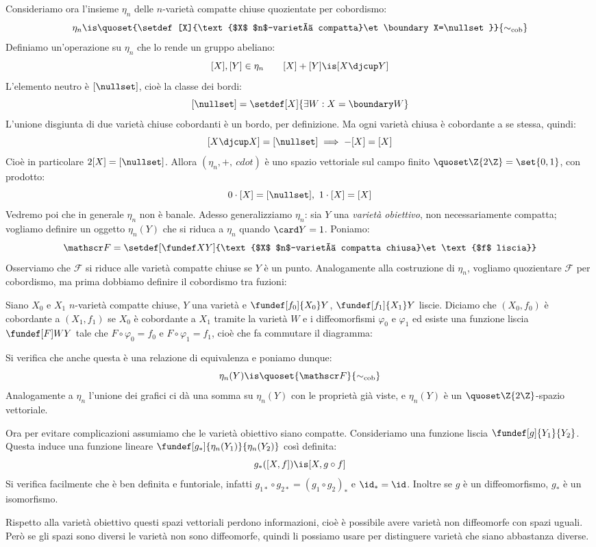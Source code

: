 Consideriamo ora l'insieme $\eta_n$ delle $n$-varietà compatte chiuse quozientate per cobordismo:
\[\eta_n\is\quoset{\setdef[X]{\text{$X$ $n$-varietà compatta}\et\boundary X=\nullset}}{\sim_\text{cob}}\]
Definiamo un'operazione su $\eta_n$ che lo rende un gruppo abeliano:
\[[X],[Y]\in\eta_n\qquad[X]+[Y]\is[X\djcup Y]\]
L'elemento neutro è $[\nullset]$, cioè la classe dei bordi:
\[[\nullset]=\setdef[X]{\exists W:X=\boundary W}\]
L'unione disgiunta di due varietà chiuse cobordanti è un bordo, per definizione. Ma ogni varietà chiusa è cobordante a se stessa, quindi:
\[[X\djcup X]=[\nullset]\implies-[X]=[X]\]
Cioè in particolare $2[X]=[\nullset]$. Allora $(\eta_n,+,\	cdot)$ è uno spazio vettoriale sul campo finito $\quoset\Z{2\Z}=\set{0,1}$, con prodotto:
\[0\cdot[X]=[\nullset],\ 1\cdot[X]=[X]\]
Vedremo poi che in generale $\eta_n$ non è banale. Adesso generalizziamo $\eta_n$: sia $Y$ una \emph{varietà obiettivo}, non necessariamente compatta; vogliamo definire un oggetto $\eta_n(Y)$ che si riduca a $\eta_n$ quando $\card Y=1$. Poniamo:
\[\mathscr F=\setdef[\fundef XY]{\text{$X$ $n$-varietà compatta chiusa}\et\text{$f$ liscia}}\]
Osserviamo che $\mathscr F$ si riduce alle varietà compatte chiuse se $Y$ è un punto. Analogamente alla costruzione di $\eta_n$, vogliamo quozientare $\mathscr F$ per cobordismo, ma prima dobbiamo definire il cobordismo tra fuzioni:

\begin{defn}
	Siano $X_0$ e $X_1$ $n$-varietà compatte chiuse, $Y$ una varietà e $\fundef[f_0]{X_0}Y$, $\fundef[f_1]{X_1}Y$ liscie. Diciamo che $(X_0,f_0)$ è cobordante a $(X_1,f_1)$ se $X_0$ è cobordante a $X_1$ tramite la varietà $W$ e i diffeomorfismi $\varphi_0$ e $\varphi_1$ ed esiste una funzione liscia $\fundef[F]WY$ tale che $F\circ\varphi_0=f_0$ e $F\circ\varphi_1=f_1$, cioè che fa commutare il diagramma:
	\begin{center}
		
	\end{center}
\end{defn}

Si verifica che anche questa è una relazione di equivalenza e poniamo dunque:
\[\eta_n(Y)\is\quoset{\mathscr F}{\sim_\text{cob}}\]
Analogamente a $\eta_n$ l'unione dei grafici ci dà una somma su $\eta_n(Y)$ con le proprietà già viste, e $\eta_n(Y)$ è un $\quoset\Z{2\Z}$-spazio vettoriale.

Ora per evitare complicazioni assumiamo che le varietà obiettivo siano compatte. Consideriamo una funzione liscia $\fundef[g]{Y_1}{Y_2}$. Questa induce una funzione lineare $\fundef[g_*]{\eta_n(Y_1)}{\eta_n(Y_2)}$ così definita:
\[g_*([X,f])\is[X,g\circ f]\]
Si verifica facilmente che è ben definita e funtoriale, infatti $g_{1*}\circ g_{2*}=(g_1\circ g_2)_*$ e $\id_*=\id$. Inoltre se $g$ è un diffeomorfismo, $g_*$ è un isomorfismo.

Rispetto alla varietà obiettivo questi spazi vettoriali perdono informazioni, cioè è possibile avere varietà non diffeomorfe con spazi uguali. Però se gli spazi sono diversi le varietà non sono diffeomorfe, quindi li possiamo usare per distinguere varietà che siano abbastanza diverse.
